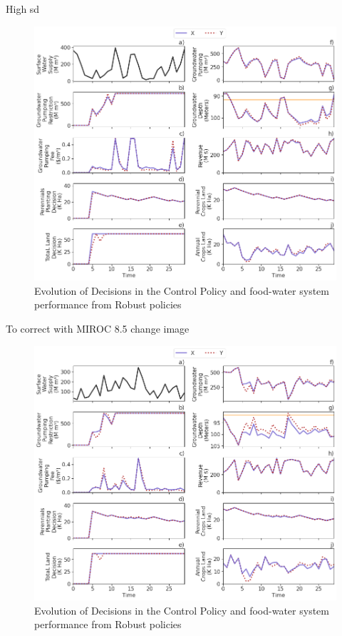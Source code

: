 \documentclass[11pt,a4paper]{article}
\begin{document}
High sd 
\begin{figure}[H]
    \centering
    \includegraphics[width=1\textwidth]{selected_robust_performance_s1.png}
    \caption{Evolution of Decisions in the Control Policy and food-water system performance from Robust policies}
    \label{fig:m1esh1}
\end{figure}

To correct with MIROC 8.5
change image
\begin{figure}[H]
    \centering
    \includegraphics[width=1\textwidth]{selected_robust_performance_s2_dry.png}
    \caption{Evolution of Decisions in the Control Policy and food-water system performance from Robust policies}
    \label{fig:m1esh1}
\end{figure}
\end{document}
